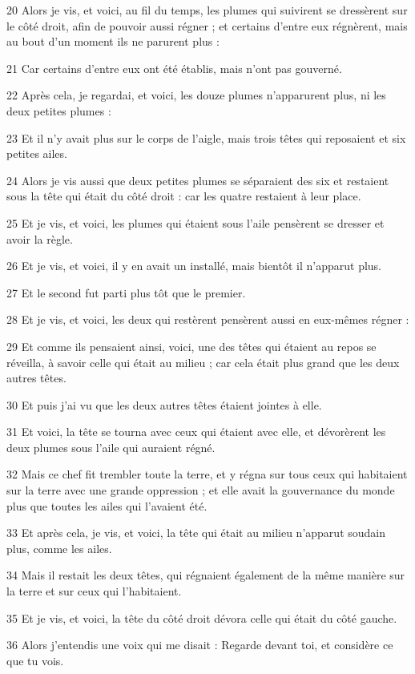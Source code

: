 \par 20 Alors je vis, et voici, au fil du temps, les plumes qui suivirent se dressèrent sur le côté droit, afin de pouvoir aussi régner ; et certains d'entre eux régnèrent, mais au bout d'un moment ils ne parurent plus :
\par 21 Car certains d'entre eux ont été établis, mais n'ont pas gouverné.
\par 22 Après cela, je regardai, et voici, les douze plumes n'apparurent plus, ni les deux petites plumes :
\par 23 Et il n'y avait plus sur le corps de l'aigle, mais trois têtes qui reposaient et six petites ailes.
\par 24 Alors je vis aussi que deux petites plumes se séparaient des six et restaient sous la tête qui était du côté droit : car les quatre restaient à leur place.
\par 25 Et je vis, et voici, les plumes qui étaient sous l'aile pensèrent se dresser et avoir la règle.
\par 26 Et je vis, et voici, il y en avait un installé, mais bientôt il n'apparut plus.
\par 27 Et le second fut parti plus tôt que le premier.
\par 28 Et je vis, et voici, les deux qui restèrent pensèrent aussi en eux-mêmes régner :
\par 29 Et comme ils pensaient ainsi, voici, une des têtes qui étaient au repos se réveilla, à savoir celle qui était au milieu ; car cela était plus grand que les deux autres têtes.
\par 30 Et puis j'ai vu que les deux autres têtes étaient jointes à elle.
\par 31 Et voici, la tête se tourna avec ceux qui étaient avec elle, et dévorèrent les deux plumes sous l'aile qui auraient régné.
\par 32 Mais ce chef fit trembler toute la terre, et y régna sur tous ceux qui habitaient sur la terre avec une grande oppression ; et elle avait la gouvernance du monde plus que toutes les ailes qui l'avaient été.
\par 33 Et après cela, je vis, et voici, la tête qui était au milieu n'apparut soudain plus, comme les ailes.
\par 34 Mais il restait les deux têtes, qui régnaient également de la même manière sur la terre et sur ceux qui l'habitaient.
\par 35 Et je vis, et voici, la tête du côté droit dévora celle qui était du côté gauche.
\par 36 Alors j'entendis une voix qui me disait : Regarde devant toi, et considère ce que tu vois.
